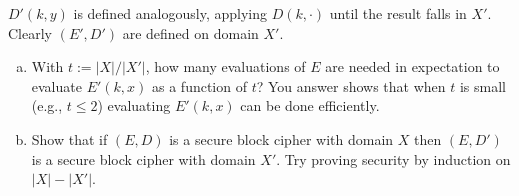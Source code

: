 $D'(k, y)$ is defined analogously, applying $D(k, ·)$ until the result falls in $X'$. Clearly $(E', D')$ are defined on domain $X'$.

\begin{enumerate}[(a)]
    \item With $t := |X|/|X'|$, how many evaluations of $E$ are needed in expectation to evaluate $E'(k, x)$ as a function of $t$? You answer shows that when $t$ is small (e.g., $t \leq 2$) evaluating $E'(k, x)$ can be done efficiently.
    
    \item Show that if $(E,D)$ is a secure block cipher with domain $X$ then $(E, D')$ is a secure block cipher with domain $X'$. Try proving security by induction on $|X |-|X'|$.
\end{enumerate}

